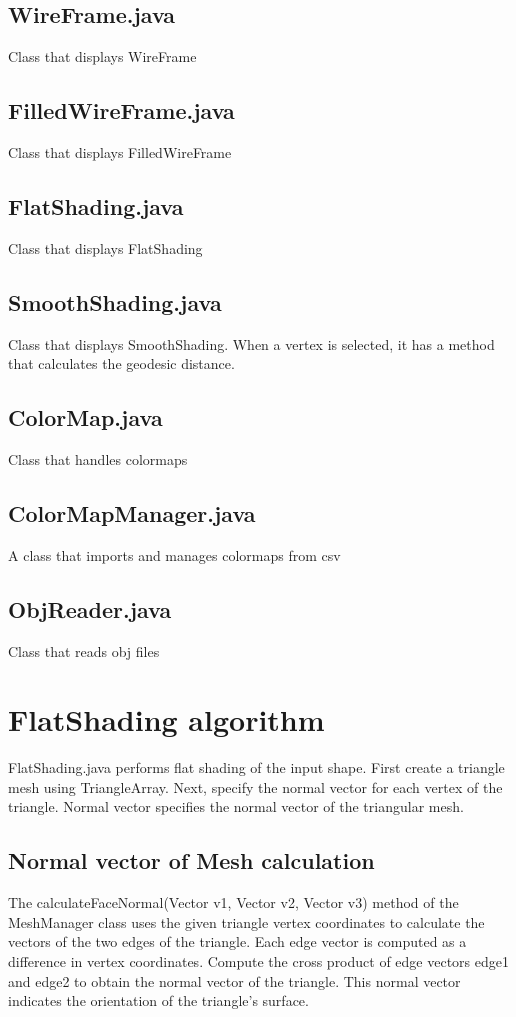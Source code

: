 \documentclass[12pt]{article}
\begin{document}
\subsection{WireFrame.java}
Class that displays WireFrame
\subsection{FilledWireFrame.java}
Class that displays FilledWireFrame
\subsection{FlatShading.java}
Class that displays FlatShading
\subsection{SmoothShading.java}
Class that displays SmoothShading. When a vertex is selected, it has a method
that calculates the geodesic distance.
\subsection{ColorMap.java}
Class that handles colormaps
\subsection{ColorMapManager.java}
A class that imports and manages colormaps from csv
\subsection{ObjReader.java}
Class that reads obj files

\section{FlatShading algorithm}
FlatShading.java performs flat shading of the input shape. First create a
triangle mesh using TriangleArray. Next, specify the normal vector for each
vertex of the triangle. Normal vector specifies the normal vector of the
triangular mesh.
\subsection{Normal vector of Mesh calculation}
The calculateFaceNormal(Vector v1, Vector v2, Vector v3) method of the
MeshManager class uses the given triangle
vertex coordinates to calculate the vectors of the two edges of the triangle.
Each edge vector is computed as a difference in vertex coordinates. Compute the
cross product of edge vectors edge1 and edge2 to obtain the normal vector of
the triangle. This normal vector indicates the orientation of the triangle's
surface.
\end{document}
